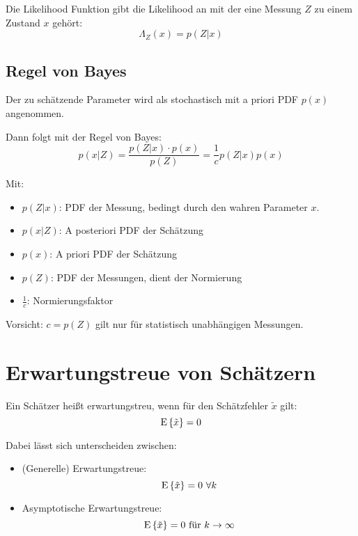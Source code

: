 Die Likelihood Funktion gibt die Likelihood an mit der eine Messung $Z$ zu einem Zustand $x$ gehört:
\begin{equation*}
    \Lambda_Z(x) = p(Z|x)
\end{equation*}

\subsection{Regel von Bayes}
Der zu schätzende Parameter wird als stochastisch mit a priori PDF $p(x)$ angenommen.

Dann folgt mit der Regel von Bayes:
\begin{equation*}
    p(x|Z) = \frac{p(Z|x) \cdot p(x)}{p(Z)} = \frac{1}{c} p(Z|x) p(x)
\end{equation*}

Mit:
\begin{itemize}
    \item $p(Z|x)$: PDF der Messung, bedingt durch den wahren Parameter $x$.
    \item $p(x|Z)$: A posteriori PDF der Schätzung
    \item $p(x)$: A priori PDF der Schätzung
    \item $p(Z)$: PDF der Messungen, dient der Normierung
    \item $\frac{1}{c}$: Normierungsfaktor
\end{itemize}

Vorsicht: $c = p(Z)$ gilt nur für statistisch unabhängigen Messungen.

\section{Erwartungstreue von Schätzern}
Ein Schätzer heißt erwartungstreu, wenn für den Schätzfehler $\tilde{x}$ gilt:
\begin{equation*}
    \operatorname*{E}\left\{\tilde{x}\right\} = 0
\end{equation*}

Dabei lässt sich unterscheiden zwischen:
\begin{itemize}
    \item (Generelle) Erwartungstreue:
        \begin{equation*}
            \operatorname*{E}\left\{\tilde{x}\right\} = 0\ \forall k
        \end{equation*}
    \item Asymptotische Erwartungstreue:
        \begin{equation*}
            \operatorname*{E}\left\{\tilde{x}\right\} = 0\ \text{für } k \to \infty
        \end{equation*}
\end{itemize}

